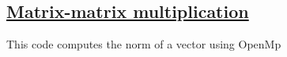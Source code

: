 \subsection*{\href{{https://github.com/CompPhysics/ComputationalPhysicsMSU/blob/master/doc/Programs/ParallelizationOpenMP/OpenMPvectornorm.cpp}}{Matrix-matrix multiplication}}
This code computes the norm of a vector using OpenMp


























































